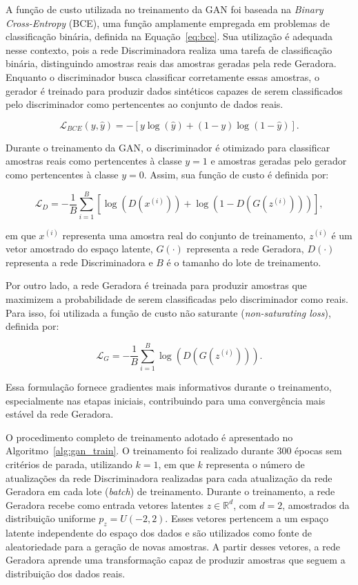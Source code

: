 A função de custo utilizada no treinamento da GAN foi baseada na \textit{Binary Cross-Entropy} (BCE), uma função amplamente empregada em problemas de classificação binária, definida na Equação~\ref{eq:bce}. Sua utilização é adequada nesse contexto, pois a rede Discriminadora realiza uma tarefa de classificação binária, distinguindo amostras reais das amostras geradas pela rede Geradora. Enquanto o discriminador busca classificar corretamente essas amostras, o gerador é treinado para produzir dados sintéticos capazes de serem classificados pelo discriminador como pertencentes ao conjunto de dados reais.

\begin{equation}
\mathcal{L}_{BCE}(y,\hat{y})
=
-\left[
y\log(\hat{y})
+
(1-y)\log(1-\hat{y})
\right].
\label{eq:bce}
\end{equation}

Durante o treinamento da GAN, o discriminador é otimizado para classificar amostras reais como pertencentes à classe $y=1$ e amostras geradas pelo gerador como pertencentes à classe $y=0$. Assim, sua função de custo é definida por:

\begin{equation}
\mathcal{L}_D
=
-\frac{1}{B}
\sum_{i=1}^{B}
\left[
\log(D(x^{(i)}))
+
\log\left(1-D(G(z^{(i)}))\right)
\right],
\label{eq:loss_discriminator}
\end{equation}

em que $x^{(i)}$ representa uma amostra real do conjunto de treinamento, $z^{(i)}$ é um vetor amostrado do espaço latente, $G(\cdot)$ representa a rede Geradora, $D(\cdot)$ representa a rede Discriminadora e $B$ é o tamanho do lote de treinamento.

Por outro lado, a rede Geradora é treinada para produzir amostras que maximizem a probabilidade de serem classificadas pelo discriminador como reais. Para isso, foi utilizada a função de custo não saturante (\textit{non-saturating loss}), definida por:

\begin{equation}
\mathcal{L}_G
=
-\frac{1}{B}
\sum_{i=1}^{B}
\log\left(D(G(z^{(i)}))\right).
\label{eq:loss_generator}
\end{equation}

Essa formulação fornece gradientes mais informativos durante o treinamento,
especialmente nas etapas iniciais, contribuindo para uma convergência mais
estável da rede Geradora.

O procedimento completo de treinamento adotado é apresentado no Algoritmo~\ref{alg:gan_train}. O treinamento foi realizado durante 300 épocas sem critérios de parada, utilizando $k=1$, em que $k$ representa o número de atualizações da rede Discriminadora realizadas para cada atualização da rede Geradora em cada lote (\textit{batch}) de treinamento. Durante o treinamento, a rede Geradora recebe como entrada vetores latentes $z \in \mathbb{R}^{d}$, com $d=2$, amostrados da distribuição uniforme $p_z = U(-2,2)$. Esses vetores pertencem a um espaço latente independente do espaço dos dados e são utilizados como fonte de aleatoriedade para a geração de novas amostras. A partir desses vetores, a rede Geradora aprende uma transformação capaz de produzir amostras que seguem a distribuição dos dados reais. 

